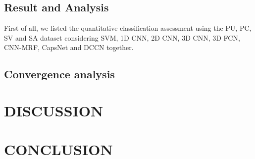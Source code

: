 \documentclass{article}
\begin{document}
	\subsection{Result and Analysis}\label{subsec:result-and-analysis}
	First of all, we listed the quantitative classification assessment using the PU, PC, SV and SA dataset considering
	SVM,
	1D CNN\cite{hu2015deep},
	2D CNN\cite{sharma2016hyperspectral},
	3D CNN\cite{hamida20183},
	3D FCN\cite{lee2016contextual},
	CNN-MRF\cite{cao2018hyperspectral},
	CapsNet and DCCN together.

	\subsection{Convergence analysis}\label{subsec:convergence}


	\section{DISCUSSION}\label{sec:discussion}


	\section{CONCLUSION}\label{sec:conclusion}


	
\end{document}
